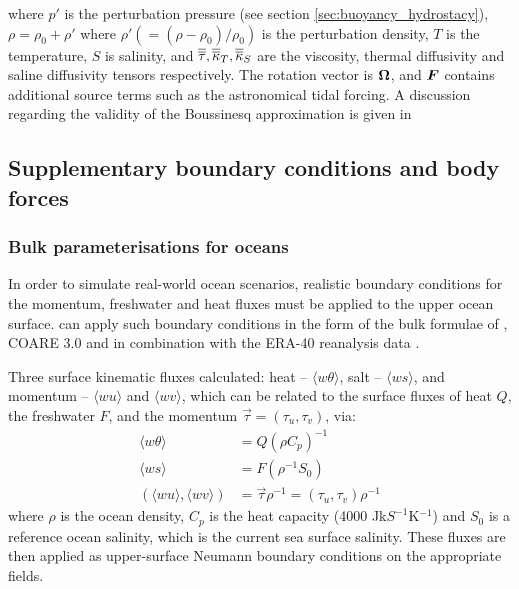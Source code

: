 where $p'$ is the perturbation pressure (see section \ref{sec:buoyancy_hydrostacy}),
$\rho=\rho_0+\rho'$ where $\rho'(=(\rho-\rho_0)/\rho_0)$ is the perturbation density,
$T$ is the temperature, $S$ is salinity, and
$\overline{\overline{\tau}},\overline{\overline{\kappa}}_T,\overline{\overline{\kappa}}_S$ are the viscosity, thermal diffusivity and saline
diffusivity tensors respectively.
The rotation vector is ${\mbox{\boldmath$\Omega$}}$, and ${\mbox{\boldmath$F$}}$ contains additional source terms such as the astronomical tidal forcing. A discussion
regarding the validity of the Boussinesq approximation is given in \cite{Gray1976}

\subsection{Supplementary boundary conditions and body forces}

\subsubsection{Bulk parameterisations for oceans}

In order to simulate real-world ocean scenarios, realistic boundary conditions for the momentum, freshwater and heat fluxes
must be applied to the upper ocean surface. \fluidity can apply such boundary conditions in the form of the bulk formulae of \citet{large2004},
COARE 3.0 \citep{fairall2003} and \citet{kara2005} in combination with the ERA-40 reanalysis data \citep{Uppala2005}.

Three surface kinematic fluxes calculated: heat -- $\langle w\theta \rangle$,
salt -- $\langle ws \rangle$, and momentum -- $\langle wu \rangle$ and $\langle wv \rangle$,
which can be related to the surface fluxes of heat $Q$, the
freshwater $F$, and the momentum $\overrightarrow\tau=\left(\tau_u,\tau_v\right)$, via:
\begin{align}
\langle w\theta \rangle &= Q\left(\rho C_p \right)^{-1} \\
\langle ws \rangle &= F\left(\rho^{-1}S_0\right) \\
\left(\langle wu \rangle, \langle wv \rangle\right) &=
\overrightarrow{\tau}\rho^{-1} =
\left(\tau_u,\tau_v\right)\rho^{-1}
\end{align}
where $\rho$ is the ocean density, $C_p$ is the heat capacity (4000 Jk$S^{-1}$K$^{-1}$)
and $S_0$ is a reference ocean salinity, which is the current sea surface salinity.
These fluxes are then applied as upper-surface Neumann boundary conditions on
the appropriate fields.

